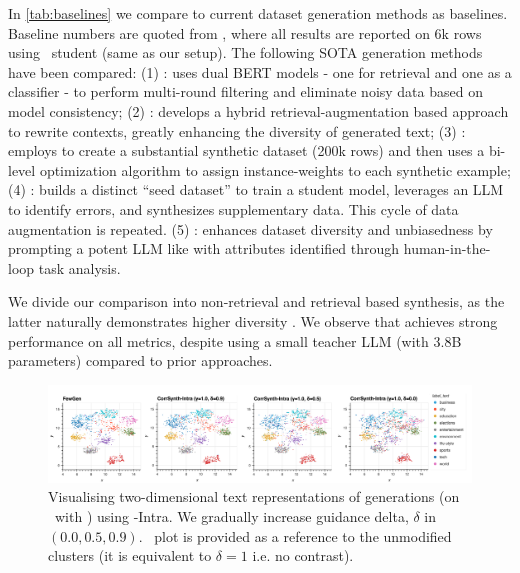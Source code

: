 In \autoref{tab:baselines} we compare \corrsyn{} to current dataset generation methods as baselines. Baseline numbers are quoted from \citet{divekar2024synthesizrr}, where all results are reported on 6k rows using \DistilBERT\ student (same as our setup). The following SOTA generation methods have been compared: 
(1) \textbf{\ReGen{}} \cite{yu-etal-2023-regen}: uses dual BERT models - one for retrieval and one as a classifier - to perform multi-round filtering and eliminate noisy data based on model consistency; 
(2) \textbf{\SynthesizRR{}} \cite{divekar2024synthesizrr}: develops a hybrid retrieval-augmentation based approach to rewrite contexts, greatly enhancing the diversity of generated text;
(3) \textbf{\SunGen{}} \cite{gao2023selfguided}: employs \ZeroGen{} \cite{ye2022zerogen} to create a substantial synthetic dataset (200k rows) and then uses a bi-level optimization algorithm to assign instance-weights to each synthetic example; 
(4) \textbf{\LetsSynth{}} \cite{wang-etal-2023-lets}: builds a distinct ``seed dataset'' to train a student model, leverages an LLM to identify errors, and synthesizes supplementary data. This cycle of data augmentation is repeated.
(5) \textbf{\AttrPrompt{}} \cite{yu2023large}: enhances dataset diversity and unbiasedness by prompting a potent LLM like \ChatGPT{} with attributes identified through human-in-the-loop task analysis.

We divide our comparison into non-retrieval and retrieval based synthesis, as the latter naturally demonstrates higher diversity \citep{divekar2024synthesizrr}. We observe that \corrsyn{} achieves strong performance on all metrics, despite using a small teacher LLM (\PhiMini with 3.8B parameters) compared to prior approaches. 




\begin{figure}[!t]
\centering
    \includegraphics[width=\textwidth]{figure/umaps_v3.png}
    \vspace{-0.8cm}
    \caption{Visualising two-dimensional text representations of generations (on \ToIHeadlines\ with \PhiMini) using \corrsyn-Intra. We gradually increase guidance delta, $\delta$ in $(0.0, 0.5, 0.9)$. \fewgen\ plot is provided as a reference to the unmodified clusters (it is equivalent to $\delta=1$ i.e. no contrast).}
    \vspace{-1em}
    \label{fig:intra_label_umaps}
\end{figure}






